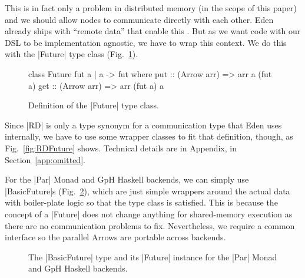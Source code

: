 This is in fact only a problem in distributed memory (in the scope of this paper) and we should  allow nodes to communicate directly with each other. Eden already ships with \enquote{remote data} that enable this \cite{AlGo03a,Dieterle2010}.
But as we want code with our DSL to be implementation agnostic, we have to wrap this context. We do this with the |Future| type class (Fig.~\ref{fig:future}).
\begin{figure}[h]
\begin{code}
class Future fut a | a -> fut where
    put :: (Arrow arr) => arr a (fut a)
    get :: (Arrow arr) => arr (fut a) a
\end{code}
\caption{Definition of the |Future| type class.}
\label{fig:future}
\end{figure}
Since |RD| is only a type synonym for a communication type that Eden uses internally, we have to use some wrapper classes to fit that definition, though, as Fig.~\ref{fig:RDFuture} shows. %
Technical details are in Appendix, in Section~\ref{app:omitted}.

For the |Par| Monad and GpH Haskell backends, we can simply use |BasicFuture|s (Fig.~\ref{fig:BasicFuture}), which are just simple wrappers around the actual data with boiler-plate logic so that the type class is satisfied. This is because the concept of a |Future| does not change anything for shared-memory execution as there are no communication problems to fix. Nevertheless, we require a common interface so the parallel Arrows are portable across backends.
\begin{figure}[tb]
\caption{The |BasicFuture| type and its |Future| instance for the |Par| Monad and GpH Haskell backends.}
\label{fig:BasicFuture}
\end{figure} %


